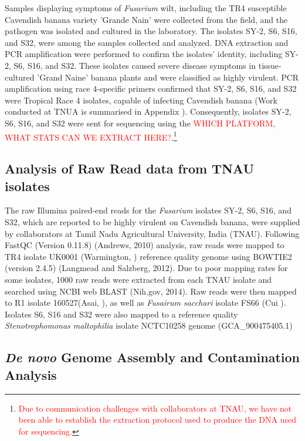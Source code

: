 Samples displaying symptoms of \textit{Fusarium} wilt, including the \Foc TR4 susceptible Cavendish banana variety 'Grande Nain' were collected from the field, and the pathogen was isolated and cultured in the laboratory. The isolates SY-2, S6, S16, and S32, were among the samples collected and analyzed. DNA extraction and PCR amplification were performed to confirm the isolates' identity, including SY-2, S6, S16, and S32. These isolates caused severe disease symptoms in tissue-cultured 'Grand Naine' banana plants and were classified as highly virulent. PCR amplification using race 4-specific primers confirmed that SY-2, S6, S16, and S32 were \Foc Tropical Race 4 isolates, capable of infecting Cavendish banana (Work conducted at TNUA is summarised in Appendix ). Consequently, isolates SY-2, S6, S16, and S32 were sent for sequencing using the \textcolor{red}{WHICH PLATFORM, WHAT STATS CAN WE EXTRACT HERE?}.\footnote{\textcolor{red}{Due to communication challenges with collaborators at TNAU, we have not been able to establish the extraction protocol used to produce the DNA used for sequencing.}}

\subsection{Analysis of Raw Read data from TNAU isolates}

The raw Illumina paired-end reads for the \textit{Fusarium} isolates SY-2, S6, S16, and S32, which are reported to be highly virulent on Cavendish banana, were supplied by collaborators at Tamil Nadu Agricultural University, India (TNAU). Following FastQC (Version 0.11.8) (Andrews, 2010) analysis, raw reads were mapped to \Focub TR4 isolate UK0001 (Warmington, ) reference quality genome using BOWTIE2 (version 2.4.5) (Langmead and Salzberg, 2012). Due to poor mapping rates for some isolates, 1000 raw reads were extracted from each TNAU isolate and searched using NCBI web BLAST (Nih.gov, 2014). 
Raw reads were then mapped to \Focub R1 isolate 160527(Asai, ), as well as \textit{Fusairum sacchari} isolate FS66 (Cui ). Isolates S6, S16 and S32 were also mapped to a reference quality \textit{Stenotrophomonas maltophilia} isolate NCTC10258 genome (GCA\_900475405.1) 

\subsection{\textit{De novo} Genome Assembly and Contamination Analysis}

